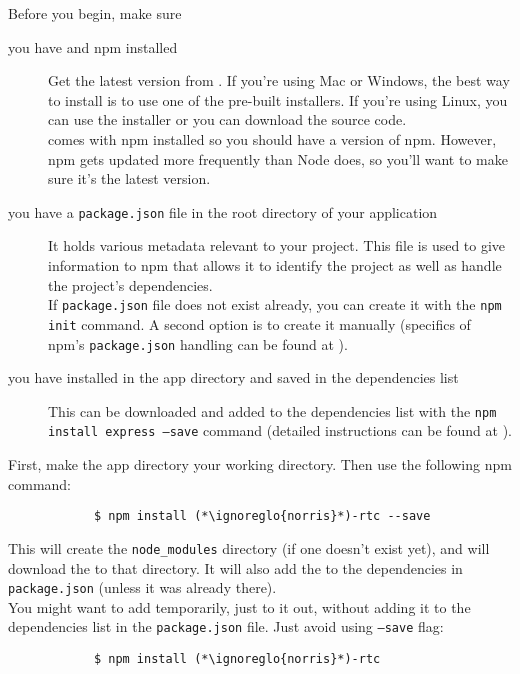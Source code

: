 		Before you begin, make sure
		\begin{description}
			\item[you have  and npm installed] Get the latest version from . If you're using Mac or Windows, the best way to install  is to use one of the pre-built installers. If you're using Linux, you can use the installer or you can download the source code.\\
			 comes with npm installed so you should have a version of npm. However, npm gets updated more frequently than Node does, so you'll want to make sure it's the latest version.
			\item[you have a \texttt{package.json} file in the root directory of your application] It holds various metadata relevant to your project. This file is used to give information to npm that allows it to identify the project as well as handle the project's dependencies.\\
			If \texttt{package.json} file does not exist already, you can create it with the \texttt{npm init} command. A second option is to create it manually (specifics of npm's \texttt{package.json} handling can be found at ).
			\item[you have  installed in the app directory and saved in the dependencies list] This  can be downloaded and added to the dependencies list with the \texttt{npm install express --save} command (detailed instructions can be found at ).
		\end{description}
		First, make the app directory your working directory. Then use the following npm command:
		\begin{lstlisting}
			$ npm install (*\ignoreglo{norris}*)-rtc --save
		\end{lstlisting}
		This will create the \texttt{node\_modules} directory (if one doesn't exist yet), and will download the  to that directory. It will also add the  to the dependencies in \texttt{package.json} (unless it was already there).\\
		You might want to add  temporarily, just to it out, without adding it to the dependencies list in the \texttt{package.json} file. Just avoid using \texttt{--save} flag:
		\begin{lstlisting}
			$ npm install (*\ignoreglo{norris}*)-rtc
		\end{lstlisting}